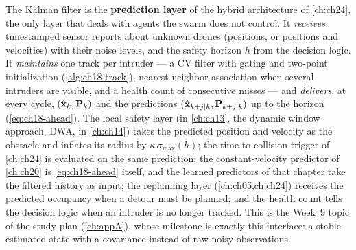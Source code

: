 \begin{dronebox}
The Kalman filter is the \textbf{prediction layer} of the hybrid architecture
of \cref{ch:ch24}, the only layer that deals with agents the swarm does not
control. It \emph{receives} timestamped sensor reports about unknown drones
(positions, or positions and velocities) with their noise levels, and the
safety horizon $h$ from the decision logic. It \emph{maintains} one track per
intruder --- a CV filter with gating and two-point initialization
(\cref{alg:ch18-track}), nearest-neighbor association when several intruders
are visible, and a health count of consecutive misses --- and \emph{delivers},
at every cycle, $(\hat{\mathbf{x}}_k,\mathbf{P}_k)$ and the predictions
$(\hat{\mathbf{x}}_{k+j\mid k},\mathbf{P}_{k+j\mid k})$ up to the horizon
(\cref{eq:ch18-ahead}). The local safety layer (\orca in \cref{ch:ch13}, the
dynamic window approach, DWA, in \cref{ch:ch14}) takes the predicted position
and velocity as the obstacle
and inflates its radius by $\kappa\,\sigma_{\max}(h)$; the time-to-collision
trigger of \cref{ch:ch24} is evaluated on the same prediction; the
constant-velocity predictor of \cref{ch:ch20} is \cref{eq:ch18-ahead} itself,
and the learned predictors of that chapter take the filtered history as
input; the replanning layer (\cref{ch:ch05,ch:ch24}) receives the predicted
occupancy when a detour must be planned; and the health count tells the
decision logic when an intruder is no longer tracked. This is the Week~9
topic of the study plan (\cref{ch:appA}), whose milestone is exactly this
interface: a stable estimated state with a covariance instead of raw noisy
observations.
\end{dronebox}


